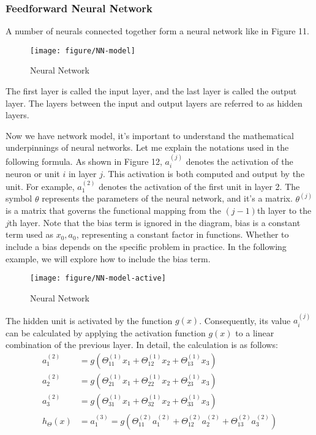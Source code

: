 \documentclass{article}
\begin{document}
    \newpage
	\subsubsection{Feedforward Neural Network}

    A number of neurals connected together form a neural network like in Figure 11.

    \begin{figure}[htbp]
        \centering
        \texttt{[image: figure/NN-model]}
        \caption{Neural Network}
        \end{figure}



    The first layer is called the input layer, and the last layer is called the output layer. The layers between the input and output layers are referred to as hidden layers.

    Now we have network model, it's important to understand the mathematical underpinnings of neural networks. Let me explain the notations used in the following formula. As shown in Figure 12, $a^{(j)}_{i}$ denotes the activation of the neuron or unit $i$ in layer $j$. This activation is both computed and output by the unit. For example, $a^{(2)}_1$ denotes the activation of the first unit in layer 2. The symbol $\theta$ represents the parameters of the neural network, and it's a matrix. $\theta^{(j)}$ is a matrix that governs the functional mapping from the $(j-1)$th layer to the $j$th layer. Note that the bias term is ignored in the diagram, bias is a constant term used as $x_0, a_0$, representing a constant factor in functions. Whether to include a bias depends on the specific problem in practice. In the following example, we will explore how to include the bias term.


    \begin{figure}[htbp]
        \centering
        \texttt{[image: figure/NN-model-active]}
        \caption{Neural Network}
        \end{figure}

    The hidden unit is activated by the function $g(x)$. Consequently, its value $a^{(j)}_{i}$ can be calculated by applying the activation function $g(x)$ to a linear combination of the previous layer. In detail, the calculation is as follows:
    \begin{equation}
    \begin{aligned} a_1^{(2)} & =g\left(\Theta_{11}^{(1)} x_1+\Theta_{12}^{(1)} x_2+\Theta_{13}^{(1)} x_3\right) \\ a_2^{(2)} & =g\left(\Theta_{21}^{(1)} x_1+\Theta_{22}^{(1)} x_2+\Theta_{23}^{(1)} x_3\right) \\ a_3^{(2)} & =g\left(\Theta_{31}^{(1)} x_1+\Theta_{32}^{(1)} x_2+\Theta_{33}^{(1)} x_3\right) \\ h_{\Theta}(x) & =a_1^{(3)}=g\left(\Theta_{11}^{(2)} a_1^{(2)}+\Theta_{12}^{(2)} a_2^{(2)}+\Theta_{13}^{(2)} a_3^{(2)}\right)\end{aligned}
    \end{equation} \\
\end{document}
